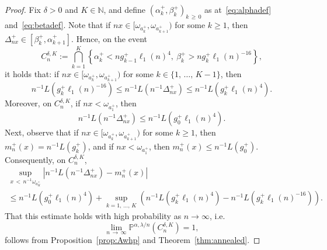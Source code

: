 \documentclass[10pt]{amsart}
\theoremstyle{definition}\newtheorem{defi}[theo]{Definition}\newtheorem{rema}[theo]{Remark}\newtheorem{exam}[theo]{Example}\newtheorem{exem}[theo]{Example}\newtheorem{nota}[theo]{Notation}
\newcommand{\N}{\mathbb N}
\renewcommand{\P}{\mathbb P}
\newcommand{\A}{{4}}
\newcommand{\B}{{16}}
\begin{document}
\begin{proof}
Fix $\delta>0$ and $K\in\N$, and define $(\alpha_k^+,\beta_k^+)_{k\,\geq\,0}$ as at~\eqref{eq:alphadef} and~\eqref{eq:betadef}.
Note that if $nx\in [\omega_{a_k^+},\omega_{a_{k+1}^+})$ for some $k\geq 1$, then $\Delta_{nx}^+\in[\beta_k^+,\alpha_{k+1}^+]$. Hence, on the event
\[
C_n^{\delta,K}:={\textstyle\bigcap_{k=1}^K}\left\{\alpha_k^+<ng_{k-1}^+\ell_1(n)^\A,\:\beta_k^+>ng_{k}^+\ell_1(n)^{-\B}\right\},
\]
it holds that: if $nx\in [\omega_{a_k^+},\omega_{a_{k+1}^+})$ for some $k\in\{1,\,\dots,\,K-1\}$, then
\[
n^{-1}L\left(g_{k}^+\ell_1(n)^{-\B}\right)\leq n^{-1}L\left(n^{-1}\Delta_{nx}^+\right)\leq n^{-1}L\left(g_{k}^+\ell_1(n)^\A\right).
\]
Moreover, on $C_n^{\delta,K}$, if $nx< \omega_{a_1^+}$, then
\[
n^{-1}L\left(n^{-1}\Delta_{nx}^+\right)\leq n^{-1}L\left(g_{0}^+\ell_1(n)^\A\right).
\]
Next, observe that if $nx\in [\omega_{a_k^+},\omega_{a_{k+1}^+})$ for some $k\geq 1$, then $m_n^+(x)=n^{-1}L(g_k^+)$, and if $nx<\omega_{a_1^+}$, then $m_n^+(x)\leq n^{-1}L(g_0^+)$. Consequently, on $C_n^{\delta,K}$,
\begin{multline*}
\sup_{x\,<\,n^{-1} \omega_{a_K^+}}\left| n^{-1}L\left(n^{-1}\Delta_{nx}^+\right)-m_n^+(x)\right|\\
\leq n^{-1}L\left(g_{0}^+\ell_1(n)^\A\right)+\sup_{k=1,\,\dots,\,K}
\left(n^{-1}L\left(g_{k}^+\ell_1(n)^\A\right)- n^{-1}L\left(g_{k}^+\ell_1(n)^{-\B}\right)\right).
\end{multline*}
That this estimate holds with high probability as $n\rightarrow\infty$, i.e.\
\[
\lim_{n\,\rightarrow\,\infty}\P^{\alpha,\lambda/n}\left(C_n^{\delta,K}\right)=1,
\]
follows from Proposition~\ref{prop:Awhp} and Theorem~\ref{thm:annealed}.


\end{proof}
\end{document}
